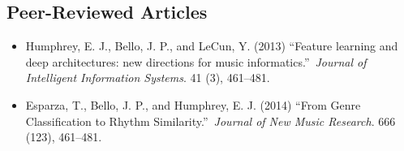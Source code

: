 \subsection{Peer-Reviewed Articles}
\renewcommand{\thefootnote}{\fnsymbol{footnote}}
\vspace{1em}
\begin{itemize}
\onehalfspacing
\item Humphrey, E. J., Bello, J. P., and LeCun, Y. (2013) ``Feature learning and deep architectures: new directions for music informatics.''~{\it Journal of Intelligent Information Systems}. 41 (3), 461--481.

\item Esparza, T., Bello, J. P., and Humphrey, E. J. (2014) ``From Genre Classification to Rhythm Similarity.''~{\it Journal of New Music Research}. 666 (123), 461--481.


\end{itemize}

